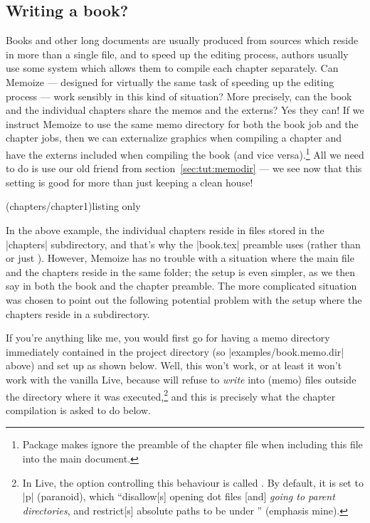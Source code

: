 \documentclass[a4paper,11pt]{article}
\begin{document}
\subsection{Writing a book?}
\label{sec:tut:multifile}

Books and other long documents are usually produced from sources which reside
in more than a single file, and to speed up the editing process, authors
usually use some system which allows them to compile each chapter separately.
Can Memoize --- designed for virtually the same task of speeding up the editing
process --- work sensibly in this kind of situation?  More precisely, can the
book and the individual chapters share the memos and the externs?  Yes they
can!  If we instruct Memoize to use the same memo directory for both the book
job and the chapter jobs, then we can externalize graphics when compiling a
chapter and have the externs included when compiling the book (and vice
versa).\footnote{Package  makes  ignore the preamble of
  the chapter file when including this file into the main document.} All we
need to do is use our old friend  from section~\ref{sec:tut:memodir}
--- we see now that this setting is good for more than just keeping a clean
house!


\begin{tcbraster}[raster columns=2, raster valign=top]
  \tcbinputexample(chapters/chapter1){listing only}
\end{tcbraster}

In the above example, the individual chapters reside in files stored in the
|chapters| subdirectory, and that's why the |book.tex| preamble uses
 (rather than  or just ).  However, Memoize has no trouble
with a situation where the main file and the chapters reside in the same
folder; the setup is even simpler, as we then say 
in both the book and the chapter preamble.  The more complicated situation was
chosen to point out the following potential problem with the setup where the
chapters reside in a subdirectory.

If you're anything like me, you would first go for having a memo directory
immediately contained in the project directory (so |examples/book.memo.dir|
above) and set up  as shown below.  Well, this won't work, or
at least it won't work with the vanilla  Live, because 
will refuse to \emph{write} into (memo) files outside the directory where it
was executed,\cprotect\footnote{In  Live, the 
  option controlling this behaviour is called .  By default, it is
  set to |p| (paranoid), which ``disallow[s] opening dot files [and]
  \emph{going to parent directories}, and restrict[s] absolute paths to be
  under '' (emphasis mine).}  and this is precisely what
the chapter compilation is asked to do below.
\end{document}
